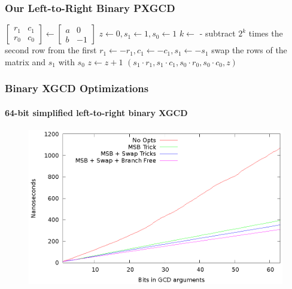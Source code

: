 \documentclass{beamer}
\newcommand{\ZZgez}{\mathbb{Z}_{\ge 0}}
\newcommand{\matrixtt}[4]{\left[ \begin{array}{rr} #1 & #2 \\ #3 & #4 \end{array} \right]}
\begin{document}
\begin{frame}
\frametitle{Our Left-to-Right Binary PXGCD}
\begin{algorithmic}[1]
 \Comment{$a, b, T \in \ZZgez$}
\State $\matrixtt{r_1}{c_1}{r_0}{c_0} \gets \matrixtt{a}{0}{b}{-1}$
\State $z \gets 0, s_1 \gets 1, s_0 \gets 1$
	\State $k \gets $  - 
	\State subtract $2^k$ times the second row from the first
	 $r_1 \gets -r_1, c_1 \gets -c_1, s_1 \gets -s_1$ \EndIf
		\State swap the rows of the matrix and $s_1$ with $s_0$
		\State $z \gets z + 1$
	\EndIf
\EndWhile
\State \Return $(s_1 \cdot r_1, s_1 \cdot c_1, s_0 \cdot r_0, s_0 \cdot c_0, z)$
\EndProcedure
\end{algorithmic}
\end{frame}


\begin{frame}
\frametitle{Binary XGCD Optimizations}
\framesubtitle{64-bit simplified left-to-right binary XGCD}
\begin{figure}
\includegraphics[scale=0.86]{xgcd-binary-optimizations-64}
\end{figure}
\end{frame}
\end{document}

